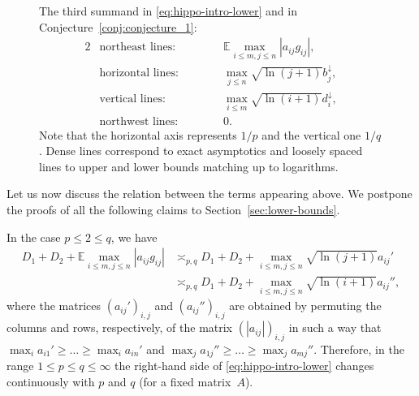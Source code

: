 \documentclass[a4paper]{amsart}
\theoremstyle{definition}
\theoremstyle{remark}
\numberwithin{equation}{section}
\newcommand*{\EE}{\mathbb{E}}
\newcommand*{\rearr}{\downarrow} %
\newcommand*{\MyLabelSpace}{0.1} %
\begin{document}
\begin{figure}[h]
	\caption[foo]{
The third summand in \eqref{eq:hippo-intro-lower} and  in Conjecture~\ref{conj:conjecture_1}:
		\begin{alignat*}{2}
		&\text{northeast lines: \ } && \qquad\EE \max_{i \le m,j\le n} |a_{ij}g_{ij}|,\\
		&\text{horizontal lines: \ }  && \qquad \max_{j\le n}\sqrt{\ln (j+1)} b_j^{\rearr{}},\\
		&\text{vertical lines: \ } &&\qquad \max_{i\le m}\sqrt{\ln (i+1)} d_i^{\rearr{}},\\
		&\text{northwest lines: \ } &&\qquad 0.
		\end{alignat*}
		Note that the horizontal axis represents $1/p$ and the vertical one $1/q$.
		Dense lines correspond to exact asymptotics
		and loosely spaced lines to upper and lower bounds matching up to logarithms. 
	}	
	\label{fig:diagram-big-after} %
\end{figure}	


Let us now discuss the relation between the terms appearing above. We postpone the proofs of all the following claims to Section~\ref{sec:lower-bounds}.

In the case $p\le 2 \le q$, we have
\begin{align}		\label{eq:bound_Emax_term}
	D_1+D_2+ \EE \max_{i \le m,j\le n} |a_{ij}g_{ij}| 
	&\asymp_{p, q} D_1+D_2+\max_{i\le m, j\le n}\sqrt{\ln (j+1)} a_{ij}' 
	\\
	&\asymp_{p, q} D_1+D_2+\max_{i\le m, j\le n}\sqrt{\ln (i+1)} a_{ij}'',\nonumber
\end{align}
where the matrices $(a_{ij}')_{i,j}$ and $(a_{ij}'')_{i,j}$ are obtained by permuting the columns and rows, respectively, of the matrix $(|a_{ij}|)_{i,j}$ in such a way that $\max_i a_{i1}'\ge \dots \ge \max_i a_{in}'$ and $\max_j a_{1j}'' \ge \dots \ge \max_j a_{mj}''$. 
Therefore, in the range $1\le p\le q \le \infty$ the right-hand side of \eqref{eq:hippo-intro-lower} changes continuously with $p$ and $q$ (for a fixed matrix~$A$). 
\end{document}
